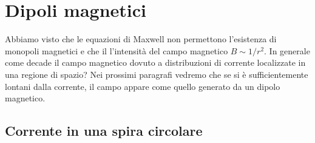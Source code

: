 \section{Dipoli magnetici}

Abbiamo visto che le equazioni di Maxwell non permettono l'esistenza di monopoli magnetici e che il l'intensit\`a del campo magnetico $B \sim 1/r^2$. In generale come decade il campo magnetico dovuto a distribuzioni di corrente localizzate in una regione di spazio? Nei prossimi paragrafi vedremo che se si \`e sufficientemente lontani dalla corrente, il campo appare come quello generato da un dipolo magnetico.

\subsection{Corrente in una spira circolare}


